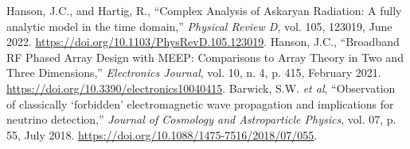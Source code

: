 \documentclass{article}
\begin{document}
\begin{thebibliography}{10}
 Hanson, J.C., and Hartig, R., ``Complex Analysis of Askaryan Radiation: A fully analytic model in the time domain,'' \emph{Physical Review D}, vol. 105, 123019, June 2022. \url{https://doi.org/10.1103/PhysRevD.105.123019}.
 Hanson, J.C., ``Broadband RF Phased Array Design with MEEP: Comparisons to Array Theory in Two and Three Dimensions,'' \emph{Electronics Journal}, vol. 10, n. 4, p. 415, February 2021. \url{https://doi.org/10.3390/electronics10040415}.
 Barwick, S.W. \textit{et al}, ``Observation of classically `forbidden' electromagnetic wave propagation and implications for neutrino detection,'' \emph{Journal of Cosmology and Astroparticle Physics}, vol. 07, p. 55, July 2018. \url{https://doi.org/10.1088/1475-7516/2018/07/055}.
\end{thebibliography}
\end{document}
